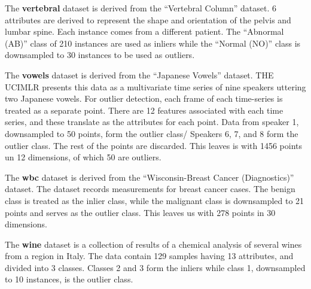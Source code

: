 The \textbf{vertebral} dataset is derived from the ``Vertebral Column'' dataset.
6 attributes are derived to represent the shape and orientation of the pelvis and lumbar spine.
Each instance comes from a different patient.
The ``Abnormal (AB)'' class of 210 instances are used as inliers while the ``Normal (NO)'' class is downsampled to 30 instances to be used as outliers.

The \textbf{vowels} dataset is derived from the ``Japanese Vowels'' dataset.
THE UCIMLR presents this data as a multivariate time series of nine speakers uttering two Japanese vowels.
For outlier detection, each frame of each time-series is treated as a separate point.
There are 12 features associated with each time series, and these translate as the attributes for each point.
Data from speaker 1, downsampled to 50 points, form the outlier class/
Speakers 6, 7, and 8 form the outlier class.
The rest of the points are discarded.
This leaves is with 1456 points un 12 dimensions, of which 50 are outliers.

The \textbf{wbc} dataset is derived from the ``Wisconsin-Breast Cancer (Diagnostics)'' dataset.
The dataset records measurements for breast cancer cases.
The benign class is treated as the inlier class, while the malignant class is downsampled to 21 points and serves as the outlier class.
This leaves us with 278 points in 30 dimensions.

The \textbf{wine} dataset is a collection of results of a chemical analysis of several wines from a region in Italy.
The data contain 129 samples having 13 attributes, and divided into 3 classes.
Classes 2 and 3 form the inliers while class 1, downsampled to 10 instances, is the outlier class.
